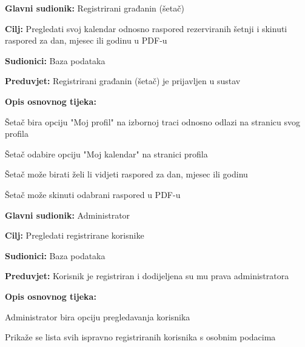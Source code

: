 	\noindent {}
	\begin{packed_item}
		
		\item \textbf{Glavni sudionik:} Registrirani građanin (šetač)
		\item  \textbf{Cilj:} Pregledati svoj kalendar odnosno raspored rezerviranih šetnji i skinuti raspored za dan, mjesec ili godinu u PDF-u
		\item  \textbf{Sudionici:} Baza podataka
		\item  \textbf{Preduvjet:} Registrirani građanin (šetač) je prijavljen u sustav
		\item  \textbf{Opis osnovnog tijeka:}
		
		\item[] \begin{packed_enum}
			\item Šetač bira opciju "Moj profil" na izbornoj traci odnosno odlazi na stranicu svog profila
			\item Šetač odabire opciju "Moj kalendar" na stranici profila
			\item Šetač može birati želi li vidjeti raspored za dan, mjesec ili godinu
			\item Šetač može skinuti odabrani raspored u PDF-u
		\end{packed_enum}
	\end{packed_item}


	\noindent \underbar{\textbf{UC17 - Pregled korisnika}}
	\begin{packed_item}
		
		\item \textbf{Glavni sudionik:} Administrator
		\item  \textbf{Cilj:} Pregledati registrirane korisnike
		\item  \textbf{Sudionici:} Baza podataka
		\item  \textbf{Preduvjet:} Korisnik je registriran i dodijeljena su mu prava administratora
		\item  \textbf{Opis osnovnog tijeka:}
		
		\item[] \begin{packed_enum}
			\item Administrator bira opciju pregledavanja korisnika
			\item Prikaže se lista svih ispravno registriranih korisnika s osobnim podacima
		\end{packed_enum}
	\end{packed_item}


